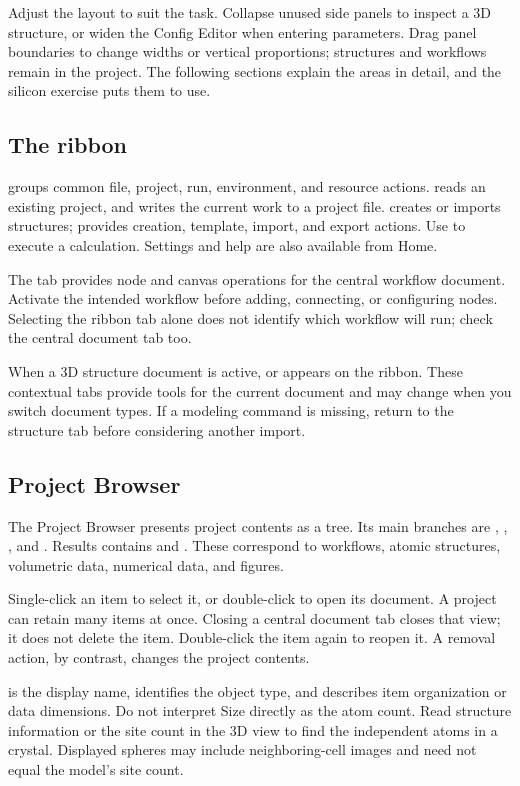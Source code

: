 Adjust the layout to suit the task. Collapse unused side panels to inspect a 3D structure, or widen the Config Editor when entering parameters. Drag panel boundaries to change widths or vertical proportions; structures and workflows remain in the project. The following sections explain the areas in detail, and the silicon exercise puts them to use.

\subsection{The ribbon}
 groups common file, project, run, environment, and resource actions.  reads an existing project, and  writes the current work to a project file.  creates or imports structures;  provides creation, template, import, and export actions. Use  to execute a calculation. Settings and help are also available from Home.

The  tab provides node and canvas operations for the central workflow document. Activate the intended workflow before adding, connecting, or configuring nodes. Selecting the ribbon tab alone does not identify which workflow will run; check the central document tab too.

When a 3D structure document is active,  or  appears on the ribbon. These contextual tabs provide tools for the current document and may change when you switch document types. If a modeling command is missing, return to the structure tab before considering another import.

\subsection{Project Browser}
The Project Browser presents project contents as a tree. Its main branches are , , , and . Results contains  and . These correspond to workflows, atomic structures, volumetric data, numerical data, and figures.

Single-click an item to select it, or double-click to open its document. A project can retain many items at once. Closing a central document tab closes that view; it does not delete the item. Double-click the item again to reopen it. A removal action, by contrast, changes the project contents.

 is the display name,  identifies the object type, and  describes item organization or data dimensions. Do not interpret Size directly as the atom count. Read structure information or the site count in the 3D view to find the independent atoms in a crystal. Displayed spheres may include neighboring-cell images and need not equal the model's site count.

